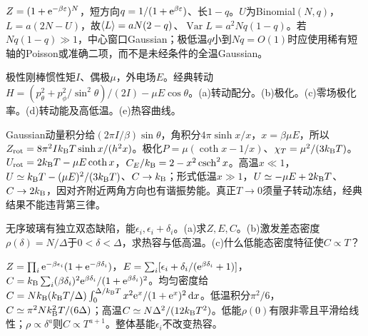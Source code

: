 \begin{solution}
$Z=(1+\mathrm e^{-\beta\varepsilon})^N$，短方向$q=1/(1+\mathrm e^{\beta\varepsilon})$、长$1-q$。$U$为Binomial$(N,q)$，$L=a(2N-U)$，故$\langle L\rangle=aN(2-q)$、$\operatorname{Var}L=a^2Nq(1-q)$。若$Nq(1-q)\gg1$，中心窗口Gaussian；极低温$q$小到$Nq=O(1)$时应使用稀有短轴的Poisson或准确二项，而不是未经条件的全温Gaussian。
\end{solution}
\begin{exercise}[原题7(a)--(e)]\label{p:333-4-7}
极性刚棒惯性矩$I$、偶极$\mu$，外电场$E$。经典转动$H=(p_\theta^2+p_\phi^2/\sin^2\theta)/(2I)-\mu E\cos\theta$。(a)转动配分。(b)极化。(c)零场极化率。(d)转动能及高低温。(e)热容曲线。
\end{exercise}
\begin{solution}
Gaussian动量积分给$(2\pi I/\beta)\sin\theta$，角积分$4\pi\sinh x/x$，$x=\beta\mu E$，所以$Z_{\mathrm{rot}}=8\pi^2Ik_{\mathrm B} T\sinh x/(h^2x)$。极化$P=\mu(\coth x-1/x)$、$\chi_T=\mu^2/(3k_{\mathrm B} T)$。$U_{\mathrm{rot}}=2k_{\mathrm B} T-\mu E\coth x$，$C_E/k_{\mathrm B}=2-x^2\operatorname{csch}^2x$。高温$x\ll1$，$U\simeq k_{\mathrm B} T-(\mu E)^2/(3k_{\mathrm B} T)$、$C\to k_{\mathrm B}$；形式低温$x\gg1$，$U\simeq-\mu E+2k_{\mathrm B} T$、$C\to2k_{\mathrm B}$，因对齐附近两角方向也有谐振势能。真正$T\to0$须量子转动冻结，经典结果不能违背第三律。
\begin{center}\end{center}
\end{solution}
\begin{exercise}[原题8(a)--(c)，选做]\label{p:333-4-8}
无序玻璃有独立双态缺陷，能$\epsilon_i,\epsilon_i+\delta_i$。(a)求$Z,E,C$。(b)激发差态密度$\rho(\delta)=N/\Delta$于$0<\delta<\Delta$，求热容与低高温。(c)什么低能态密度特征使$C\propto T$？
\end{exercise}
\begin{solution}
$Z=\prod_i\mathrm e^{-\beta\epsilon_i}(1+\mathrm e^{-\beta\delta_i})$，$E=\sum_i[\epsilon_i+\delta_i/(\mathrm e^{\beta\delta_i}+1)]$，$C=k_{\mathrm B}\sum_i(\beta\delta_i)^2\mathrm e^{\beta\delta_i}/(1+\mathrm e^{\beta\delta_i})^2$。均匀密度给$C=Nk_{\mathrm B}(k_{\mathrm B} T/\Delta)\int_0^{\Delta/k_{\mathrm B} T}x^2\mathrm e^x/(1+\mathrm e^x)^2\,\mathrm d x$。低温积分$\pi^2/6$，$C\simeq\pi^2Nk_{\mathrm B}^2T/(6\Delta)$；高温$C\simeq N\Delta^2/(12k_{\mathrm B} T^2)$。低能$\rho(0)$有限非零且平滑给线性；$\rho\propto\delta^a$则$C\propto T^{a+1}$。整体基能$\epsilon_i$不改变热容。
\end{solution}
